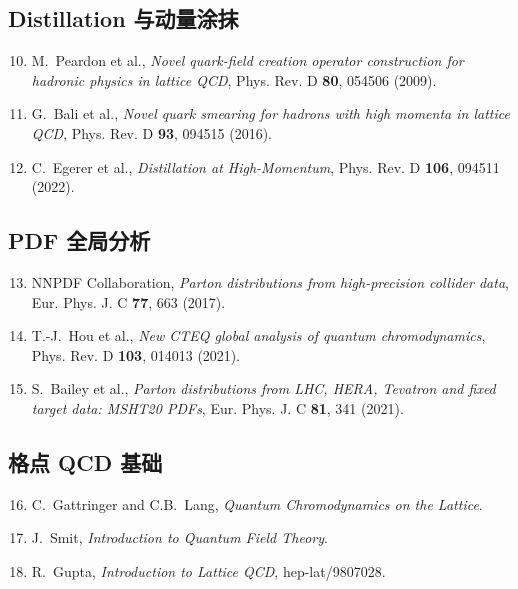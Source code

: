 \documentclass[11pt,a4paper]{ctexart}
\begin{document}
\subsection*{Distillation 与动量涂抹}
\begin{enumerate}\setcounter{enumi}{9}
  \item M.~Peardon et al., \textit{Novel quark-field creation operator construction for hadronic physics in lattice QCD}, Phys. Rev. D \textbf{80}, 054506 (2009).
  \item G.~Bali et al., \textit{Novel quark smearing for hadrons with high momenta in lattice QCD}, Phys. Rev. D \textbf{93}, 094515 (2016).
  \item C.~Egerer et al., \textit{Distillation at High-Momentum}, Phys. Rev. D \textbf{106}, 094511 (2022).
\end{enumerate}

\subsection*{PDF 全局分析}
\begin{enumerate}\setcounter{enumi}{12}
  \item NNPDF Collaboration, \textit{Parton distributions from high-precision collider data}, Eur. Phys. J. C \textbf{77}, 663 (2017).
  \item T.-J.~Hou et al., \textit{New CTEQ global analysis of quantum chromodynamics}, Phys. Rev. D \textbf{103}, 014013 (2021).
  \item S.~Bailey et al., \textit{Parton distributions from LHC, HERA, Tevatron and fixed target data: MSHT20 PDFs}, Eur. Phys. J. C \textbf{81}, 341 (2021).
\end{enumerate}

\subsection*{格点 QCD 基础}
\begin{enumerate}\setcounter{enumi}{15}
  \item C.~Gattringer and C.B.~Lang, \textit{Quantum Chromodynamics on the Lattice}.
  \item J.~Smit, \textit{Introduction to Quantum Field Theory}.
  \item R.~Gupta, \textit{Introduction to Lattice QCD}, hep-lat/9807028.
\end{enumerate}

\appendix
\end{document}
